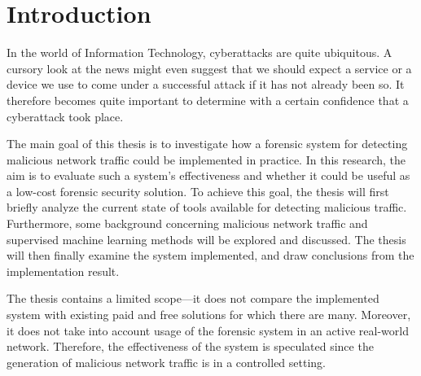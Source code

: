 \chapter{Introduction}\label{ch:introduction}

In the world of Information Technology, cyberattacks are quite ubiquitous.
A cursory look at the news might even suggest that we should expect a service or a device we use to come under a successful attack if it has not already been so.
It therefore becomes quite important to determine with a certain confidence that a cyberattack took place.

The main goal of this thesis is to investigate how a forensic system for detecting malicious network traffic could be implemented in practice.
In this research, the aim is to evaluate such a system's effectiveness and whether it could be useful as a low-cost forensic security solution.
To achieve this goal, the thesis will first briefly analyze the current state of tools available for detecting malicious traffic.
Furthermore, some background concerning malicious network traffic and supervised machine learning methods will be explored and discussed.
The thesis will then finally examine the system implemented, and draw conclusions from the implementation result.

The thesis contains a limited scope—it does not compare the implemented system with existing paid and free solutions for which there are many.
Moreover, it does not take into account usage of the forensic system in an active real-world network.
Therefore, the effectiveness of the system is speculated since the generation of malicious network traffic is in a controlled setting.
